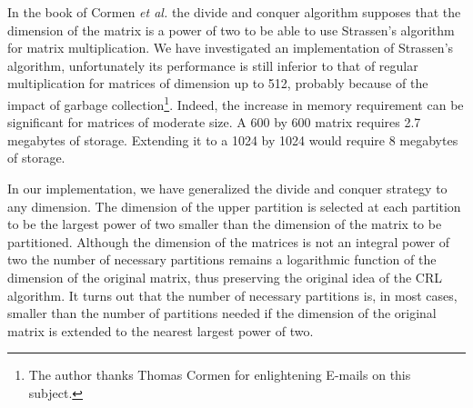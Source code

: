 \documentclass[twoside]{book}
\begin{document}
In the book of Cormen {\it et al.} \cite{CorLeiRiv} the divide and
conquer algorithm supposes that the dimension of the matrix is a
power of two to be able to use Strassen's algorithm for matrix
multiplication. We have investigated an implementation of
Strassen's algorithm, unfortunately its performance is still
inferior to that of regular multiplication for matrices of
dimension up to 512, probably because of the impact of garbage
collection\footnote{The author thanks Thomas Cormen for
enlightening E-mails on this subject.}. Indeed, the increase in
memory requirement can be significant for matrices of moderate
size. A 600 by 600 matrix requires 2.7 megabytes of storage.
Extending it to a 1024 by 1024 would require 8 megabytes of
storage.

 In our implementation, we have
generalized the divide and conquer strategy to any dimension. The
dimension of the upper partition is selected at each partition to
be the largest power of two smaller than the dimension of the
matrix to be partitioned. Although the dimension of the matrices
is not an integral power of two the number of necessary partitions
remains a logarithmic function of the dimension of the original
matrix, thus preserving the original idea of the CRL algorithm. It
turns out that the number of necessary partitions is, in most
cases, smaller than the number of partitions needed if the
dimension of the original matrix is extended to the nearest
largest power of two.
\end{document}
